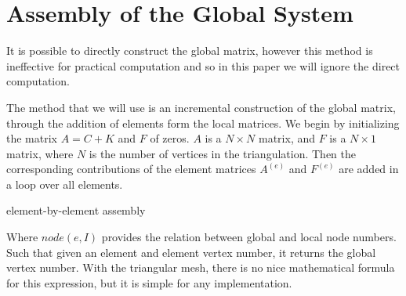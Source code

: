 \documentclass[../fem.tex]{subfiles}
\begin{document}
\section{Assembly of the Global System}%
\label{sec:assembly_of_the_global_system}

It is possible to directly construct the global matrix, however this method is
ineffective for practical computation and so in this paper we will ignore the
direct computation.

The method that we will use is an incremental construction of the global
matrix, through the addition of elements form the local matrices. We begin by
initializing the matrix $A=C+K$ and $F$ of zeros. $A$ is a $N\times N$ matrix,
and $F$ is a $N\times 1$ matrix, where $N$ is the number of vertices in the
triangulation. Then the corresponding contributions of the element matrices
$A^{(e)}$ and $F^{(e)}$ are added in a loop over all elements.

\begin{algorithm}[H]
  \caption{element-by-element assembly}
  \begin{algorithmic}
    \EndFor
  \end{algorithmic}
\end{algorithm}

Where $node(e,I)$ provides the relation between global and local node numbers.
Such that given an element and element vertex number, it returns the global
vertex number. With the triangular mesh, there is no nice mathematical formula
for this expression, but it is simple for any implementation.
\end{document}
